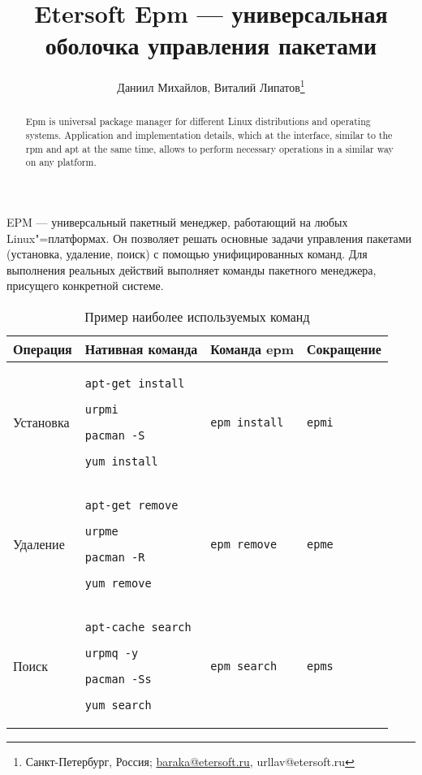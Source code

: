 \documentclass[10pt, a5paper]{article}
\def\vv!#1!{\texttt{#1}}
\begin{document}
\title{Etersoft Epm — универсальная оболочка управления пакетами}%

\author{Даниил Михайлов, Виталий Липатов\footnote{Санкт-Петербург, Россия; \url{baraka@etersoft.ru}, url{lav@etersoft.ru}}}
\maketitle

\begin{abstract}
Epm is universal package manager for different Linux distributions and operating systems. Application and implementation details, which at the interface, similar to the rpm and apt at the same time, allows to perform necessary operations in a similar way on any platform.
\end{abstract}

EPM — универсальный пакетный менеджер, работающий на любых Linux"=платформах. Он позволяет решать основные задачи управления пакетами (установка, удаление, поиск) с помощью унифицированных команд. Для выполнения реальных действий выполняет команды пакетного менеджера, присущего конкретной системе.

\begin{table}[h!]
  \centering
  \small
  \begin{tabular}{l|p{1.8cm}|l|l}
    \hline
    Операция   & Нативная команда  & Команда epm & Сокращение \\
    \hline
    Установка  & \vv!apt-get install! \par \vv!urpmi! \par \vv!pacman -S! \par \vv!yum install! & \vv!epm install! & \vv!epmi! \\
    Удаление   & \vv!apt-get remove! \par \vv!urpme! \par \vv!pacman -R! \par \vv!yum remove! & \vv!epm remove! & \vv!epme! \\
    Поиск      & \vv!apt-cache search! \par \vv!urpmq -y! \par \vv!pacman -Ss! \par \vv!yum search! & \vv!epm search! & \vv!epms! \\
    \hline
  \end{tabular}
  \caption{Пример наиболее используемых команд}
\end{table}
\end{document}
